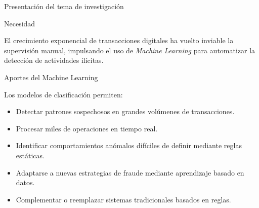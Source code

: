 \documentclass[aspectratio=169, 8pt]{beamer}
\begin{document}
\begin{frame}{Presentación del tema de investigación}

\begin{block}{Necesidad}

El crecimiento exponencial de transacciones digitales
ha vuelto inviable la supervisión manual,
impulsando el uso de \textit{Machine Learning}
para automatizar la detección de actividades ilícitas.

\end{block}

\vspace{0.2cm}

\begin{exampleblock}{Aportes del Machine Learning}

Los modelos de clasificación permiten:

\begin{itemize}

\item Detectar patrones sospechosos en grandes
volúmenes de transacciones.

\item Procesar miles de operaciones en tiempo real.

\item Identificar comportamientos anómalos
difíciles de definir mediante reglas estáticas.

\item Adaptarse a nuevas estrategias de fraude
mediante aprendizaje basado en datos.

\item Complementar o reemplazar sistemas
tradicionales basados en reglas.

\end{itemize}

\end{exampleblock}

\end{frame}
\end{document}
